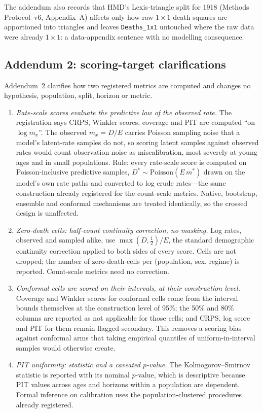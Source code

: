 The addendum also records that HMD's Lexis-triangle split for 1918 (Methods
Protocol~v6, Appendix~A) affects only how raw $1\times1$ death squares are
apportioned into triangles and leaves \texttt{Deaths\_1x1} untouched where the
raw data were already $1\times1$: a data-appendix sentence with no modelling
consequence.

\subsection{Addendum 2: scoring-target clarifications}
\label{supp:add2}

Addendum~2 clarifies how two registered metrics are computed and changes no
hypothesis, population, split, horizon or metric.

\begin{enumerate}
\item \emph{Rate-scale scores evaluate the predictive law of the observed
  rate.} The registration says CRPS, Winkler scores, coverage and PIT are
  computed ``on $\log m_x$''. The observed $m_x=D/E$ carries Poisson sampling
  noise that a model's latent-rate samples do not, so scoring latent samples
  against observed rates would count observation noise as miscalibration,
  most severely at young ages and in small populations. Rule: every
  rate-scale score is computed on Poisson-inclusive predictive samples,
  $D^{\ast}\sim\mathrm{Poisson}(E\,m^{\ast})$ drawn on the model's own rate
  paths and converted to log crude rates---the same construction already
  registered for the count-scale metrics. Native, bootstrap, ensemble and
  conformal mechanisms are treated identically, so the crossed design is
  unaffected.
\item \emph{Zero-death cells: half-count continuity correction, no masking.}
  Log rates, observed and sampled alike, use $\max(D,\tfrac12)/E$, the
  standard demographic continuity correction applied to both sides of every
  score. Cells are not dropped; the number of zero-death cells per
  (population, sex, regime) is reported. Count-scale metrics need no
  correction.
\item \emph{Conformal cells are scored on their intervals, at their
  construction level.} Coverage and Winkler scores for conformal cells come
  from the interval bounds themselves at the construction level of 95\%; the
  50\% and 80\% columns are reported as not applicable for those cells; and
  CRPS, log score and PIT for them remain flagged secondary. This removes a
  scoring bias against conformal arms that taking empirical quantiles of
  uniform-in-interval samples would otherwise create.
\item \emph{PIT uniformity: statistic and a caveated $p$-value.} The
  Kolmogorov--Smirnov statistic is reported with its nominal $p$-value, which
  is descriptive because PIT values across ages and horizons within a
  population are dependent. Formal inference on calibration uses the
  population-clustered procedures already registered.
\end{enumerate}

